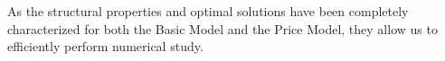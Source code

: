 \documentclass[mnsc,nonblindrev,copyedit]{informs2_wz} %
\newcommand{\OUT}[1]{}
\begin{document}
As the structural properties and optimal solutions have been completely characterized for both the Basic Model and the Price Model, they allow us to efficiently perform numerical study. \OUT{





\section{Extension \label{sect:exension}}

We discuss now the following extensions:

(1) impact to capacity decision caused by optimal hedging vs linear hedging or no hedging.

(2) correlation among demands

(3) correlation between demand and exchange rate

}
\end{document}
